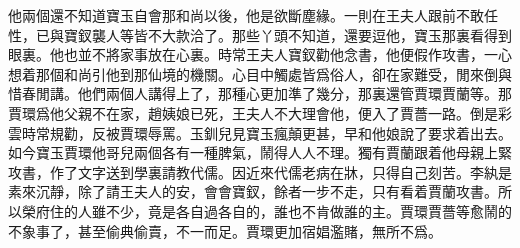 \begin{parag}
    他兩個還不知道寶玉自會那和尚以後，他是欲斷塵緣。一則在王夫人跟前不敢任性，已與寶釵襲人等皆不大款洽了。那些丫頭不知道，還要逗他，寶玉那裏看得到眼裏。他也並不將家事放在心裏。時常王夫人寶釵勸他念書，他便假作攻書，一心想着那個和尚引他到那仙境的機關。心目中觸處皆爲俗人，卻在家難受，閒來倒與惜春閒講。他們兩個人講得上了，那種心更加準了幾分，那裏還管賈環賈蘭等。那賈環爲他父親不在家，趙姨娘已死，王夫人不大理會他，便入了賈薔一路。倒是彩雲時常規勸，反被賈環辱罵。玉釧兒見寶玉瘋顛更甚，早和他娘說了要求着出去。如今寶玉賈環他哥兒兩個各有一種脾氣，鬧得人人不理。獨有賈蘭跟着他母親上緊攻書，作了文字送到學裏請教代儒。因近來代儒老病在牀，只得自己刻苦。李紈是素來沉靜，除了請王夫人的安，會會寶釵，餘者一步不走，只有看着賈蘭攻書。所以榮府住的人雖不少，竟是各自過各自的，誰也不肯做誰的主。賈環賈薔等愈鬧的不象事了，甚至偷典偷賣，不一而足。賈環更加宿娼濫賭，無所不爲。
\end{parag}


